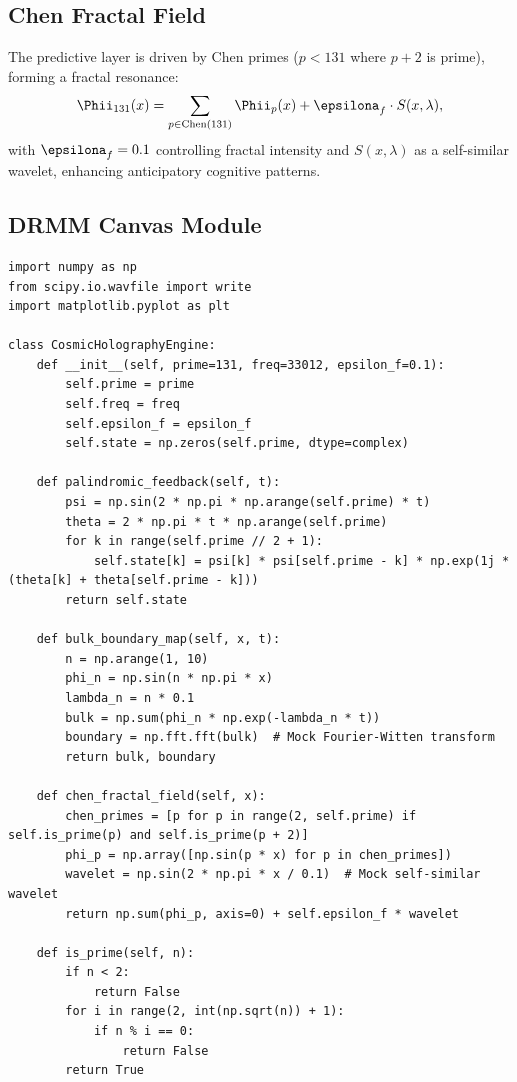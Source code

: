 \documentclass[12pt]{article}
\begin{document}
\subsection{Chen Fractal Field}
The predictive layer is driven by Chen primes ($p < 131$ where $p+2$ is prime), forming a fractal resonance:
\[
\Phii_{131}(x) = \sum_{p \in \text{Chen}(131)} \Phii_p(x) + \epsilona_f \cdot S(x, \lambda),
\]
with $\epsilona_f = 0.1$ controlling fractal intensity and $S(x, \lambda)$ as a self-similar wavelet, enhancing anticipatory cognitive patterns.

\subsection{DRMM Canvas Module}
\begin{algorithm}
\caption{CosmicHolographyEngine}
\begin{lstlisting}
import numpy as np
from scipy.io.wavfile import write
import matplotlib.pyplot as plt

class CosmicHolographyEngine:
    def __init__(self, prime=131, freq=33012, epsilon_f=0.1):
        self.prime = prime
        self.freq = freq
        self.epsilon_f = epsilon_f
        self.state = np.zeros(self.prime, dtype=complex)

    def palindromic_feedback(self, t):
        psi = np.sin(2 * np.pi * np.arange(self.prime) * t)
        theta = 2 * np.pi * t * np.arange(self.prime)
        for k in range(self.prime // 2 + 1):
            self.state[k] = psi[k] * psi[self.prime - k] * np.exp(1j * (theta[k] + theta[self.prime - k]))
        return self.state

    def bulk_boundary_map(self, x, t):
        n = np.arange(1, 10)
        phi_n = np.sin(n * np.pi * x)
        lambda_n = n * 0.1
        bulk = np.sum(phi_n * np.exp(-lambda_n * t))
        boundary = np.fft.fft(bulk)  # Mock Fourier-Witten transform
        return bulk, boundary

    def chen_fractal_field(self, x):
        chen_primes = [p for p in range(2, self.prime) if self.is_prime(p) and self.is_prime(p + 2)]
        phi_p = np.array([np.sin(p * x) for p in chen_primes])
        wavelet = np.sin(2 * np.pi * x / 0.1)  # Mock self-similar wavelet
        return np.sum(phi_p, axis=0) + self.epsilon_f * wavelet

    def is_prime(self, n):
        if n < 2:
            return False
        for i in range(2, int(np.sqrt(n)) + 1):
            if n % i == 0:
                return False
        return True


\end{lstlisting}
\end{algorithm}
\end{document}
